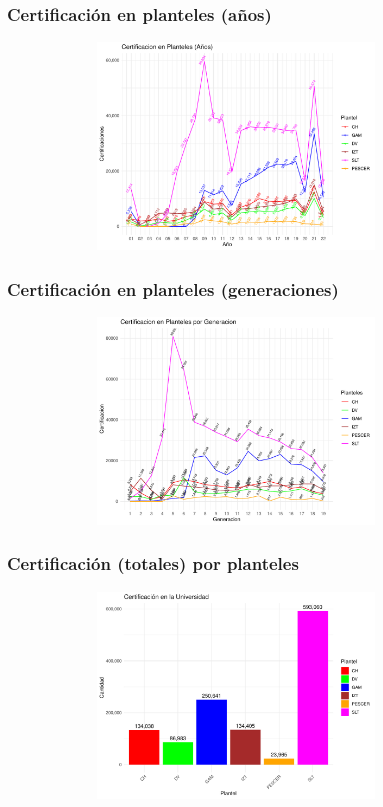 \documentclass[xcolor=dvipsnames]{beamer}
\begin{document}
\begin{frame}\frametitle{Certificaci\'on en planteles (a\~nos) }
\begin{figure}[H]
\centering
\includegraphics[width=10cm,height=5.5cm]{Imagenes/graficoCertificacionPlantelesAnhos.pdf}
\end{figure}
\end{frame}

\begin{frame}\frametitle{Certificaci\'on en planteles (generaciones)}
\begin{figure}[H]
\centering
\includegraphics[width=10cm,height=5.5cm]{Imagenes/graficoCertificacionPlantelGeneracion.pdf}
\end{figure}
\end{frame}

\begin{frame}\frametitle{Certificaci\'on (totales) por planteles}
\begin{figure}[H]
\centering
\includegraphics[width=10cm,height=5.5cm]{Imagenes/graficoCertificacionesPlanteles.pdf}
\end{figure}
\end{frame}
\end{document}
